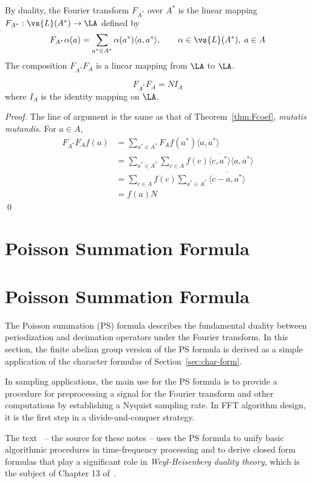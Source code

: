 By duality,  the Fourier transform
$F_{A^*}$ over $A^*$ is the linear mapping $F_{A^*} :  \vs{L}(A^*) \to \LA$
defined by
\[
F_{A^*}\alpha(a) = \sum_{a^* \in A^*}\alpha(a^*)\langle a, a^*\rangle,
\qquad \alpha \in \vs{L}(A^*), \; a\in A
\]
The composition $F_{A^*}F_A$ is a linear mapping from $\LA$ to $\LA$.
\begin{theorem}
\[
F_{A^*}F_A = N I_A
\]
where $I_A$ is the identity mapping on $\LA$.
\end{theorem}
\begin{proof}
The line of argument is the same as that of Theorem~\ref{thm:Fcoef}, {\it mutatis mutandis}.
For $a \in A$,
\begin{align*}
F_{A^*}F_A f(a)&= \sum_{a^*\in A^*}F_A f(a^*)\langle a,a^*\rangle \\
&= \sum_{a^*\in A^*}\sum_{c\in A} f(c)
\overline{\langle c,a^*\rangle}\langle a,a^*\rangle\\
&= \sum_{c\in A} f(c)\sum_{a^*\in A^*}
\overline{\langle c-a,a^*\rangle}\\
&= f(a)N
\end{align*}
\qed
\end{proof}


{\section{Poisson Summation Formula}}
{\section{Poisson Summation Formula\protect\footnotemark}
}
The Poisson summation (PS) formula describes the fundamental duality between
periodization and decimation operators under the Fourier transform.  In this
section, the finite abelian group version of the PS formula is derived as a
simple application of the character formulas of Section~\ref{sec:char-form}.

In sampling applications, the main use for the PS formula is to provide a
procedure for preprocessing a signal for the Fourier transform and other
computations by establishing a Nyquist sampling rate.  In FFT algorithm
design, it is the first step in a divide-and-conquer strategy.

The text~\cite{Tolimieri:1998} -- the source for these notes -- uses
the PS formula to unify basic algorithmic procedures in time-frequency
processing and to derive closed form formulas that play a significant role in
\emph{Weyl-Heisenberg duality theory}, which is the subject of Chapter 13
of~\cite{Tolimieri:1998}. 

